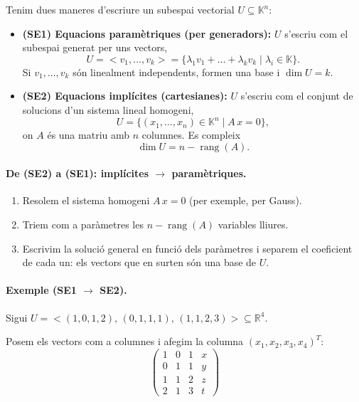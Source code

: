 \documentclass[12pt]{article}
\begin{document}
Tenim dues maneres d'escriure un subespai vectorial $U \subseteq \mathbb{K}^n$:

\begin{itemize}
    \item \textbf{(SE1) Equacions paramètriques (per generadors):} 
    $U$ s'escriu com el subespai generat per uns vectors,
    \[
        U = < v_1, \dots, v_k >
        = \{\lambda_1 v_1 + \dots + \lambda_k v_k \mid \lambda_i \in \mathbb{K}\}.
    \]
    Si $v_1,\dots,v_k$ són linealment independents, formen una base i $\dim U = k$.

    \item \textbf{(SE2) Equacions implícites (cartesianes):} 
    $U$ s'escriu com el conjunt de solucions d'un sistema lineal homogeni,
    \[
        U = \{(x_1,\dots,x_n) \in \mathbb{K}^n \mid A\,x = 0\},
    \]
    on $A$ és una matriu amb $n$ columnes. Es compleix
    \[
        \dim U = n - \operatorname{rang}(A).
    \]
\end{itemize}

\paragraph{De (SE2) a (SE1): implícites $\to$ paramètriques.}
\begin{enumerate}
    \item Resolem el sistema homogeni $A\,x=0$ (per exemple, per Gauss).
    \item Triem com a paràmetres les $n-\operatorname{rang}(A)$ variables lliures.
    \item Escrivim la solució general en funció dels paràmetres i separem el coeficient de cada un: els vectors que en surten són una base de $U$.
\end{enumerate}

\paragraph{Exemple (SE1 $\to$ SE2).}
Sigui $U = < (1,0,1,2),\,(0,1,1,1),\,(1,1,2,3) > \subseteq \mathbb{R}^4$.

Posem els vectors com a columnes i afegim la columna $(x_1,x_2,x_3,x_4)^T$:
\[
\left(\begin{array}{ccc|c}
1 & 0 & 1 & x \\
0 & 1 & 1 & y \\
1 & 1 & 2 & z \\
2 & 1 & 3 & t
\end{array}\right)
\]
\end{document}
